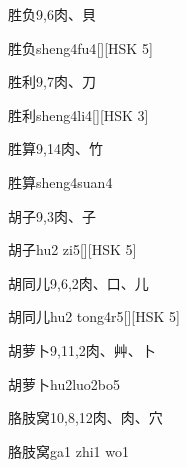 \begin{entry}{胜负}{9,6}{⾁、⾙}
  \begin{phonetics}{胜负}{sheng4fu4}[][HSK 5]
  \end{phonetics}
\end{entry}

\begin{entry}{胜利}{9,7}{⾁、⼑}
  \begin{phonetics}{胜利}{sheng4li4}[][HSK 3]
  \end{phonetics}
\end{entry}

\begin{entry}{胜算}{9,14}{⾁、⽵}
  \begin{phonetics}{胜算}{sheng4suan4}
  \end{phonetics}
\end{entry}

\begin{entry}{胡子}{9,3}{⾁、⼦}
  \begin{phonetics}{胡子}{hu2 zi5}[][HSK 5]
  \end{phonetics}
\end{entry}

\begin{entry}{胡同儿}{9,6,2}{⾁、⼝、⼉}
  \begin{phonetics}{胡同儿}{hu2 tong4r5}[][HSK 5]
  \end{phonetics}
\end{entry}

\begin{entry}{胡萝卜}{9,11,2}{⾁、⾋、⼘}
  \begin{phonetics}{胡萝卜}{hu2luo2bo5}
  \end{phonetics}
\end{entry}

\begin{entry}{胳肢窝}{10,8,12}{⾁、⾁、⽳}
  \begin{phonetics}{胳肢窝}{ga1 zhi1 wo1}
  \end{phonetics}
\end{entry}

